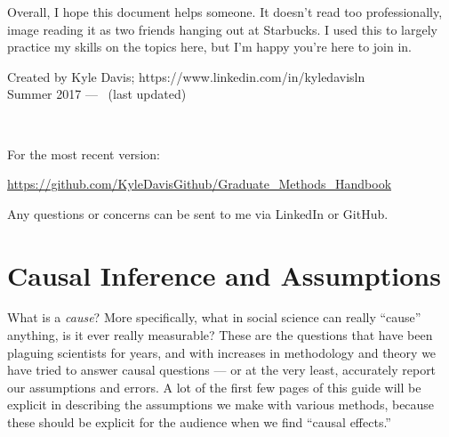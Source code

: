 \documentclass[12pt]{article}\usepackage[]{graphicx}\usepackage[]{color}
\begin{document}
\begin{flushleft}
Overall, I hope this document helps someone. It doesn't read too professionally, image reading it as two friends hanging out at Starbucks. I used this to largely practice my skills on the topics here, but I'm happy you're here to join in.

\begin{center}
Created by Kyle Davis; https://www.linkedin.com/in/kyledavisln \\
Summer 2017 --- \thedate ~(last updated)

\

For the most recent version:

\begin{center}
\url{https://github.com/KyleDavisGithub/Graduate_Methods_Handbook}
\end{center}

Any questions or concerns can be sent to me via LinkedIn or GitHub.
\end{center}

\clearpage
\tableofcontents
\thispagestyle{empty}


\clearpage
\setcounter{page}{1}

\section{Causal Inference and Assumptions}

What is a \textit{cause}? More specifically, what in social science can really ``cause'' anything, is it ever really measurable? These are the questions that have been plaguing scientists for years, and with increases in methodology and theory we have tried to answer causal questions --- or at the very least, accurately report our assumptions and errors. A lot of the first few pages of this guide will be explicit in describing the assumptions we make with various methods, because these should be explicit for the audience when we find ``causal effects.''


\end{flushleft}
\end{document}
